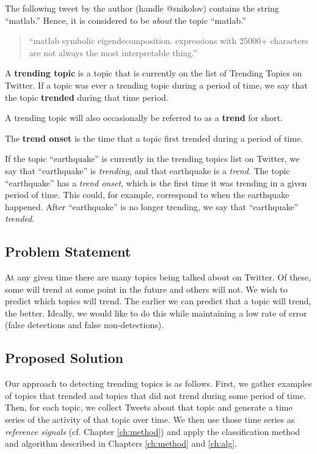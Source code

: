 \begin{example}
The following tweet by the author (handle @snikolov) contains the string
``matlab.'' Hence, it is considered to be {\em about} the topic ``matlab.''
\begin{quote}
``matlab symbolic eigendecomposition. expressions with 25000+ characters are not
always the most interpretable thing.''
\end{quote}
\end{example} 

\begin{defn}
A {\bf trending topic} is a topic that is currently on the list of Trending
Topics on Twitter. If a topic was ever a trending topic during a period of time,
we say that the topic {\bf trended} during that time period.
\end{defn}

\begin{defn}[Trend] A trending topic will also occasionally be referred to as a {\bf trend}
  for short.
\end{defn}

\begin{defn}
  The {\bf trend onset} is the time that a topic first trended during a
  period of time.
\end{defn}

\begin{example}
If the topic ``earthquake'' is currently in the trending topics list on Twitter,
we say that ``earthquake'' is {\em trending}, and that earthquake is a {\em
  trend}. The topic ``earthquake'' has a {\em trend onset}, which is the first
time it was trending in a given period of time. This could, for example,
correspond to when the earthquake happened. After ``earthquake'' is no longer
trending, we say that ``earthquake'' {\em trended}.
\end{example}

\subsection{Problem Statement}
At any given time there are many topics being talked about on Twitter. Of these,
some will trend at some point in the future and others will not. We wish to
predict which topics will trend. The earlier we can predict that a topic will
trend, the better. Ideally, we would like to do this while maintaining a low
rate of error (false detections and false non-detections).

\subsection{Proposed Solution}
Our approach to detecting trending topics is as follows. First, we gather
examples of topics that trended and topics that did not trend during
some period of time. Then, for each topic, we collect Tweets about that topic
and generate a time series of the activity of that topic over time. We then use
those time series as {\em reference signals} (cf. Chapter \ref{ch:method}) and
apply the classification method and algorithm described in Chapters
\ref{ch:method} and \ref{ch:alg}.

